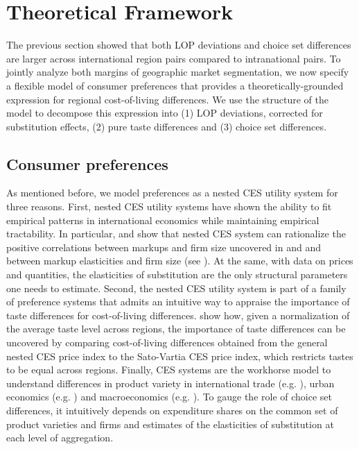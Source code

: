 \section{Theoretical Framework}\label{sec:theory}
The previous section showed that both LOP deviations and choice set differences are larger across international region pairs compared to intranational pairs. To jointly analyze both margins of geographic market segmentation, we now specify a flexible model of consumer preferences that provides a theoretically-grounded expression for regional cost-of-living differences. We use the structure of the model to decompose this expression into (1) LOP deviations, corrected for substitution effects, (2) pure taste differences and (3) choice set differences. 

\subsection{Consumer preferences}
As mentioned before, we model preferences as a nested CES utility system for three reasons. First, nested CES utility systems have shown the ability to fit empirical patterns in international economics while maintaining empirical tractability. In particular, \citet{Atkeson2008} and \citet{Hottman2016} show that nested CES system can rationalize the positive correlations between markups and firm size uncovered in \citet{Deloecker2012} and \citet{Deloecker2016} and between markup elasticities and firm size (see \citet{Berman2012, Amiti2019}). At the same, with data on prices and quantities, the elasticities of substitution are the only structural parameters one needs to estimate. Second, the nested CES utility system is part of a family of preference systems that admits an intuitive way to appraise the importance of taste differences for cost-of-living differences. \citet{Redding2020} show how, given a normalization of the average taste level across regions, the importance of taste differences can be uncovered by comparing cost-of-living differences obtained from the general nested CES price index to the Sato-Vartia CES price index, which restricts tastes to be equal across regions. Finally, CES systems are the workhorse model to understand differences in product variety in international trade (e.g. \citet{Feenstra1994,Broda2006}), urban economics (e.g. \citet{Handbury2015}) and macroeconomics (e.g. \citet{Romer1990,Jaravel2019}). To gauge the role of choice set differences, it intuitively depends on expenditure shares on the common set of product varieties and firms and estimates of the elasticities of substitution at each level of aggregation. 

